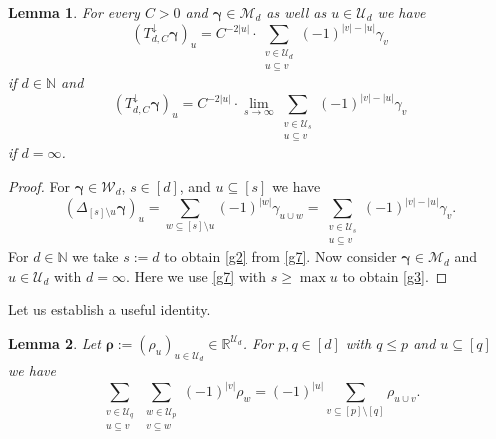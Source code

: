 \documentclass{article}
\newcommand{\R}  {{\mathbb R}}
\newcommand{\N}  {{\mathbb N}}
\newcommand{\bg}{{\boldsymbol{\gamma}}}
\newcommand{\br}{{\boldsymbol{\rho}}}
\newcommand{\U}  {\mathcal{U}}
\newcommand{\W}  {\mathcal{W}}
\newcommand{\M}  {\mathcal{M}}
\newcommand{\lo}{\downarrow}
\theoremstyle{plain}
\newtheorem{lemma}{Lemma}
\theoremstyle{definition}
\begin{document}
\begin{lemma}\label{cmd:claim_ii_neu}
For every $C>0$ and $\bg \in \M_d$ as well as
$u \in \U_d$ we have
\begin{equation}\label{g2}
\left(T^\lo_{d,C} \bg\right)_u
 = C^{-2|u|} \cdot
\sum_{\substack{v\in \U_d \\ u \subseteq v}} (-1)^{|v|-|u|} \gamma_v
\end{equation}
if $d \in \N$ and
\begin{equation}\label{g3}
\left(T^\lo_{d,C} \bg\right)_u
 = C^{-2|u|} \cdot \lim_{s \to \infty}
\sum_{\substack{v\in \U_s \\ u \subseteq v}} (-1)^{|v|-|u|} \gamma_v
\end{equation}
if $d = \infty$.
\end{lemma}

\begin{proof}
For $\bg \in \W_d$, $s \in [d]$, and $u \subseteq [s]$ we have
\begin{equation}\label{g7}
\left(\Delta_{[s]\setminus u} \bg\right)_u =
\sum_{w \subseteq [s] \setminus u} (-1)^{|w|} \gamma_{u \cup w} =
\sum_{\substack{v\in \U_s \\ u \subseteq v}} (-1)^{|v|-|u|} \gamma_v.
\end{equation}
For $d \in \N$ we take $s:=d$ to obtain \eqref{g2} from \eqref{g7}.
Now consider $\bg \in \M_d$ and $u \in \U_d$ with $d = \infty$. Here
we use \eqref{g7} with $s \geq \max u$ 
to obtain \eqref{g3}.
\end{proof}

Let us establish a useful identity.

\begin{lemma}\label{Lem:auxiliary_fact}
Let $\br := (\rho_u)_{u \in \U_d}\in \R^{\U_d}$. 
For $p,q \in [d]$ with $q \le p$
and $u \subseteq [q]$ we have
\[
\sum_{\substack{v\in \U_q \\ u \subseteq v}} 
\sum_{\substack{w\in \U_p \\ v \subseteq w}}
(-1)^{|v|} \rho_w 
=
(-1)^{|u|} 
\sum_{v \subseteq [p] \setminus [q]} \rho_{u \cup v}.
\]
\end{lemma}
\end{document}
